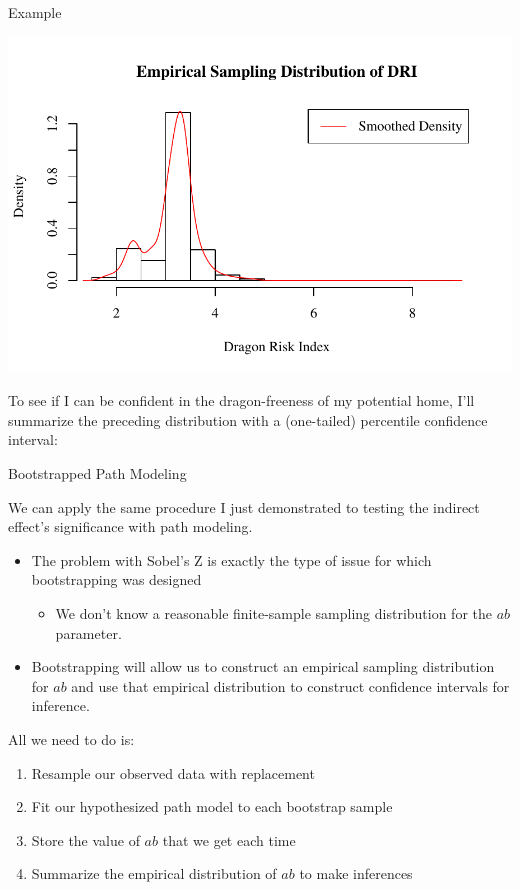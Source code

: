 \documentclass{beamer}
\newcommand{\va}[0]{\vspace{12pt}}
\newcommand{\vb}[0]{\vspace{6pt}}
\newcommand{\vc}[0]{\vspace{3pt}}
\begin{document}
\begin{frame}[allowframebreaks]{Example}
  


\pagebreak


\includegraphics{sweaveFiles/-006}

\pagebreak
To see if I can be confident in the dragon-freeness of my potential
home, I'll summarize the preceding distribution with a (one-tailed)
percentile confidence interval: 
\va


\end{frame}


\begin{frame}[shrink = 5]{Bootstrapped Path Modeling}
  
  We can apply the same procedure I just demonstrated to testing the
  indirect effect's significance with path modeling.
  \vb
  \begin{itemize}
  \item The problem with Sobel's Z is exactly the type of issue for which
    bootstrapping was designed
    \vc
    \begin{itemize}
    \item We don't know a reasonable finite-sample sampling
      distribution for the $ab$ parameter.
    \end{itemize}
    \vb  
  \item Bootstrapping will allow us to construct an empirical
    sampling distribution for $ab$ and use that empirical
    distribution to construct confidence intervals for inference.
  \end{itemize}
  \va
  All we need to do is:
  \vc
  \begin{enumerate}
  \item Resample our observed data with replacement
    \vc
  \item Fit our hypothesized path model to each bootstrap sample
    \vc
  \item Store the value of $ab$ that we get each time
    \vc
  \item Summarize the empirical distribution of $ab$ to make inferences
  \end{enumerate}
  
\end{frame}
\end{document}
